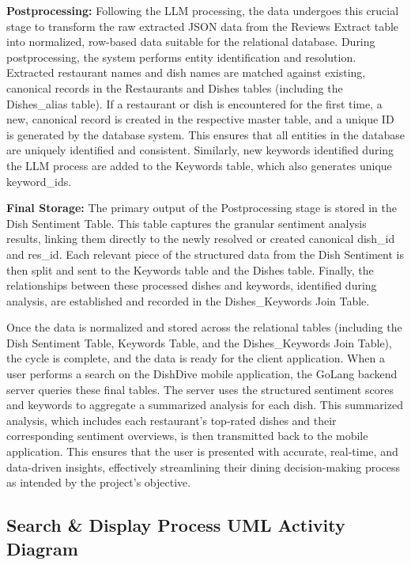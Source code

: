 \textbf{Postprocessing:} Following the LLM processing, the data undergoes this crucial stage to transform the raw extracted JSON data from the Reviews Extract table into normalized, row-based data suitable for the relational database. During postprocessing, the system performs entity identification and resolution. Extracted restaurant names and dish names are matched against existing, canonical records in the Restaurants and Dishes tables (including the Dishes\_alias table). If a restaurant or dish is encountered for the first time, a new, canonical record is created in the respective master table, and a unique ID is generated by the database system. This ensures that all entities in the database are uniquely identified and consistent. Similarly, new keywords identified during the LLM process are added to the Keywords table, which also generates unique keyword\_ids.

\textbf{Final Storage:} The primary output of the Postprocessing stage is stored in the Dish Sentiment Table. This table captures the granular sentiment analysis results, linking them directly to the newly resolved or created canonical dish\_id and res\_id. Each relevant piece of the structured data from the Dish Sentiment is then split and sent to the Keywords table and the Dishes table. Finally, the relationships between these processed dishes and keywords, identified during analysis, are established and recorded in the Dishes\_Keywords Join Table.

Once the data is normalized and stored across the relational tables (including the Dish Sentiment Table, Keywords Table, and the Dishes\_Keywords Join Table), the cycle is complete, and the data is ready for the client application. When a user performs a search on the DishDive mobile application, the GoLang backend server queries these final tables. The server uses the structured sentiment scores and keywords to aggregate a summarized analysis for each dish. This summarized analysis, which includes each restaurant’s top-rated dishes and their corresponding sentiment overviews, is then transmitted back to the mobile application. This ensures that the user is presented with accurate, real-time, and data-driven insights, effectively streamlining their dining decision-making process as intended by the project’s objective.

\subsection{Search \& Display Process UML Activity Diagram}

